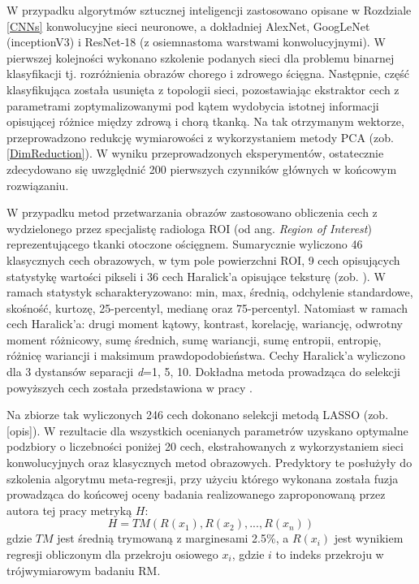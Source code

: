 W przypadku algorytmów sztucznej inteligencji zastosowano  opisane w Rozdziale \ref{CNNs} konwolucyjne sieci neuronowe, a dokładniej AlexNet, GoogLeNet (inceptionV3) i ResNet-18 (z osiemnastoma warstwami konwolucyjnymi). W pierwszej kolejności wykonano szkolenie podanych sieci dla problemu binarnej klasyfikacji tj. rozróżnienia obrazów chorego i zdrowego ścięgna. Następnie, część klasyfikująca została usunięta z topologii sieci, pozostawiając ekstraktor cech z parametrami zoptymalizowanymi pod kątem wydobycia istotnej informacji opisującej różnice między zdrową i chorą tkanką. Na tak otrzymanym wektorze, przeprowadzono redukcję wymiarowości z wykorzystaniem metody PCA (zob. \ref{DimReduction}). W wyniku przeprowadzonych eksperymentów, ostatecznie zdecydowano się uwzględnić 200 pierwszych czynników głównych w końcowym rozwiązaniu.

W przypadku metod przetwarzania obrazów zastosowano obliczenia cech z wydzielonego przez specjalistę radiologa ROI (od ang. \textit{Region of Interest}) reprezentującego tkanki otoczone ościęgnem. Sumarycznie wyliczono 46 klasycznych cech obrazowych, w tym pole powierzchni ROI, 9 cech opisujących statystykę wartości pikseli i 36 cech Haralick'a opisujące teksturę (zob. \cite{Haralick1973}). W ramach statystyk scharakteryzowano: min, max, średnią, odchylenie standardowe, skośność, kurtozę, 25-percentyl, medianę oraz 75-percentyl. Natomiast w ramach cech Haralick'a: drugi moment kątowy, kontrast, korelację, wariancję, odwrotny moment różnicowy, sumę średnich, sumę wariancji, sumę entropii, entropię, różnicę wariancji i maksimum prawdopodobieństwa. Cechy Haralick'a wyliczono dla 3 dystansów separacji \textit{d}=1, 5, 10. Dokładna metoda prowadząca do selekcji powyższych cech została przedstawiona w pracy  \cite{Nowosielski17}.  

Na zbiorze tak wyliczonych 246 cech dokonano selekcji metodą LASSO (zob. [opis]). W rezultacie dla wszystkich ocenianych parametrów uzyskano optymalne podzbiory o liczebności poniżej 20 cech, ekstrahowanych z wykorzystaniem sieci konwolucyjnych oraz klasycznych metod obrazowych. Predyktory te posłużyły do szkolenia algorytmu meta-regresji, przy użyciu którego wykonana została fuzja prowadząca do końcowej oceny badania realizowanego zaproponowaną przez autora tej pracy metryką $H$:
\begin{equation}
\label{ecq:H}
H = TM(R(x_1), R(x_2),..., R(x_n))
\end{equation}
gdzie $TM$ jest średnią trymowaną z marginesami 2.5\%, a $R(x_i)$ jest wynikiem regresji obliczonym dla przekroju osiowego $x_i$, gdzie $i$ to indeks przekroju w trójwymiarowym badaniu RM.

